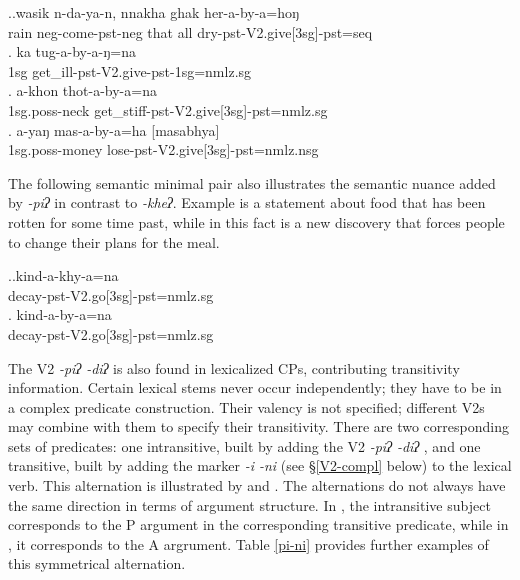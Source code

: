 \ex.\ag.wasik n-da-ya-n, nnakha ghak her-a-by-a=hoŋ\\
rain {\sc neg-}come{\sc [3sg]-pst-neg} that all dry{\sc -pst-V2.give[3sg]-pst=seq}\\
\bg. ka tug-a-by-a-ŋ=na\\
{\sc 1sg} get\_ill{\sc -pst-V2.give-pst-1sg=nmlz.sg}\\
\bg. a-khon thot-a-by-a=na\\
{\sc 1sg.poss-}neck get\_stiff{\sc -pst-V2.give[3sg]-pst=nmlz.sg}\\
\bg. a-yaŋ mas-a-by-a=ha [masabhya]\\
{\sc 1sg.poss-}money lose{\sc -pst-V2.give[3sg]-pst=nmlz.nsg}\\


The following semantic minimal pair also illustrates the semantic nuance added by  \emph{-piʔ} in contrast to \emph{-kheʔ}. Example \Next[a] is a  statement about  food that has been rotten for some time past, while in \Next[b] this fact is a new discovery that forces people to change their plans for the meal.

\ex.\ag.kind-a-khy-a=na\\
decay{\sc -pst-V2.go[3sg]-pst=nmlz.sg}\\
\bg. kind-a-by-a=na\\
decay{\sc -pst-V2.go[3sg]-pst=nmlz.sg} \\


The V2 \emph{-piʔ  \ti -diʔ} is also found in lexicalized CPs, contributing transitivity information. Certain lexical stems never occur independently; they have to be in a complex predicate construction. Their valency is not specified; different  V2s may combine with them to specify their transitivity. There are two  corresponding sets of predicates: one intransitive, built by adding the V2 \emph{-piʔ  \ti -diʔ} , and one transitive, built by adding the marker \emph{-i \ti -ni}  (see §\ref{V2-compl} below) to the lexical verb. This alternation is illustrated by \Next and \NNext. The alternations do not always have  the same direction in terms of argument structure. In \Next, the intransitive subject corresponds to the P argument in the corresponding transitive predicate, while in \NNext, it corresponds to the A argrument. Table \ref{pi-ni} provides further examples of this symmetrical alternation.


